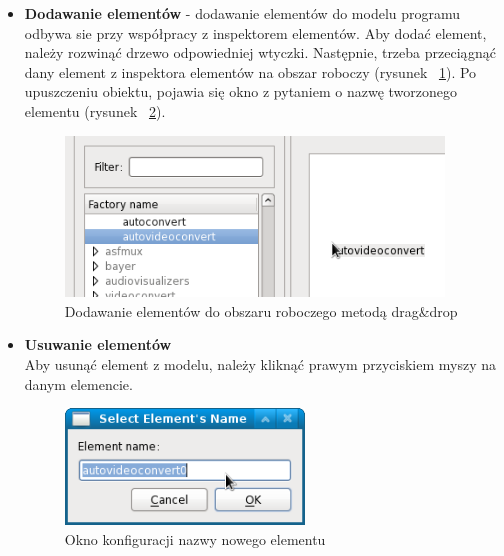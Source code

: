 \documentclass[12pt]{article}
\begin{document}
\begin{itemize}
  \setlength{\itemsep}{0em}

\item 
\textbf{Dodawanie elementów} - dodawanie elementów do modelu programu odbywa sie przy współpracy z inspektorem elementów. Aby dodać element, należy rozwinąć drzewo odpowiedniej wtyczki. Następnie, trzeba przeciągnąć dany element z inspektora elementów na obszar roboczy (rysunek ~\ref{fig:dragDropElement}). Po upuszczeniu obiektu, pojawia się okno z pytaniem o nazwę tworzonego elementu (rysunek ~\ref{fig:nameForElementWindow}).
\begin{figure}[H]
  \includegraphics[width=0.95\textwidth]{img/drag-drop-element.png}
  \caption{Dodawanie elementów do obszaru roboczego metodą drag\&drop}
  \label{fig:dragDropElement}
\end{figure}
\item \textbf{Usuwanie elementów}\\ 
Aby usunąć element z modelu, należy kliknąć prawym przyciskiem myszy na danym elemencie.
\begin{figure}[H]
  \includegraphics[width=0.6\textwidth]{img/name-for-element-window.png}
  \caption{Okno konfiguracji nazwy nowego elementu}
  \label{fig:nameForElementWindow}
\end{figure}


\end{itemize}
\end{document}
